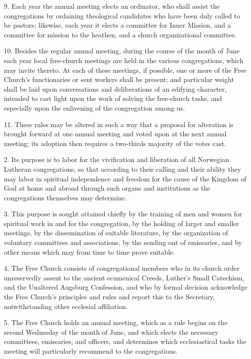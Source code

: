 {9. Each year the annual meeting elects an ordinator, who shall assist the congregations by ordaining theological candidates who have been duly called to be pastors; likewise, each year it elects a committee for Inner Mission, and a committee for mission to the heathen, and a church organizational committee.

10. Besides the regular annual meeting, during the course of the month of June each year local free-church meetings are held in the various congregations, which may invite thereto. At each of these meetings, if possible, one or more of the Free Church’s functionaries or sent workers shall be present; and particular weight shall be laid upon conversations and deliberations of an edifying character, intended to cast light upon the work of solving the free-church tasks, and especially upon the enlivening of the congregation among us.

11. These rules may be altered in such a way that a proposal for alteration is brought forward at one annual meeting and voted upon at the next annual meeting; its adoption then requires a two-thirds majority of the votes cast.
}






2. Its purpose is to labor for the vivification and liberation of all Norwegian Lutheran congregations, so that according to their calling and their ability they may labor in spiritual independence and freedom for the cause of the Kingdom of God at home and abroad through such organs and institutions as the congregations themselves may determine.

3. This purpose is sought attained chiefly by the training of men and women for spiritual work in and for the congregation, by the holding of larger and smaller meetings, by the dissemination of suitable literature, by the organization of voluntary committees and associations, by the sending out of emissaries, and by other means which may from time to time prove suitable.

4. The Free Church consists of congregational members who in its church order unreservedly assent to the ancient ecumenical Creeds, Luther’s Small Catechism, and the Unaltered Augsburg Confession, and who by formal decision acknowledge the Free Church’s principles and rules and report this to the Secretary, notwithstanding other ecclesial affiliation.

5. The Free Church holds an annual meeting, which as a rule begins on the second Wednesday of the month of June, and which elects the necessary committees, emissaries, and officers, and determines which ecclesiastical tasks the meeting will particularly recommend to the congregations.

